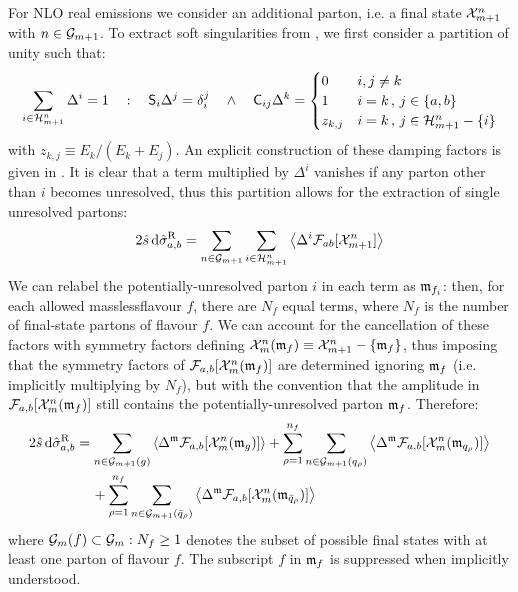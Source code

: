 For NLO real emissions we consider an additional parton, i.e. a final state $ \mathcal{X}^{n}_{m+1} $ with $ n \in \mathcal{G}_{m+1} $. To extract soft singularities from , we first consider a partition of unity such that:
\begin{equation}
  \sum_{i \in \mathcal{H}^{n}_{m+1}} \Delta^i = 1
  \quad : \quad
  \mathsf{S}_i \Delta^j = \delta_i^j
  \quad \land \quad
  \mathsf{C}_{ij} \Delta^k =
  \begin{cases}
    0 & i,j \neq k \\
    1 & i = k \,,\, j \in \{a,b\} \\
    z_{k,j} & i = k \,,\, j \in \mathcal{H}^{n}_{m+1} - \{i\}
  \end{cases}
  \label{eq:delta-part}
\end{equation}
with $ z_{k,j} \equiv E_k / (E_k + E_j) $. An explicit construction of these damping factors is given in . It is clear that a term multiplied by $ \Delta^i $ vanishes if any parton other than $ i $ becomes unresolved, thus this partition allows for the extraction of single unresolved partons:
\begin{equation*}
  2\hat{s}\, \mathrm{d}\hat{\sigma}_{a,b}^\text{R} = \sum_{n \in \mathcal{G}_{m+1}} \sum_{i \in \mathcal{H}^{n}_{m+1}} \left\langle \Delta^i \mathcal{F}_{ab}[\mathcal{X}^{n}_{m+1}] \right\rangle
\end{equation*}
We can relabel the potentially-unresolved parton $ i $ in each term as $ \mathfrak{m}_{f_i} $: then, for each allowed massless\footnotemark flavour $ f $, there are $ N_f $ equal terms, where $ N_f $ is the number of final-state partons of flavour $ f $. We can account for the cancellation of these factors with symmetry factors defining $ \mathcal{X}^{n}_{m}(\mathfrak{m}_f) \equiv \mathcal{X}^{n}_{m+1} - \{\mathfrak{m}_f\} $, thus imposing that the symmetry factors of $ \mathcal{F}_{a,b}[\mathcal{X}^{n}_{m}(\mathfrak{m}_f)] $ are determined ignoring $ \mathfrak{m}_f $ (i.e. implicitly multiplying by $ N_f $), but with the convention that the amplitude in $ \mathcal{F}_{a,b}[\mathcal{X}^{n}_{m}(\mathfrak{m}_f)] $ still contains the potentially-unresolved parton $ \mathfrak{m}_f $. Therefore:
\begin{equation}
  \begin{split}
    2\hat{s}\, \mathrm{d}\hat{\sigma}_{a,b}^\text{R}
    & = \sum_{n \in \mathcal{G}_{m+1}(g)} \left\langle \Delta^{\mathfrak{m}} \mathcal{F}_{a,b}[\mathcal{X}^{n}_{m}(\mathfrak{m}_g)] \right\rangle + \sum_{\rho = 1}^{n_f} \sum_{n \in \mathcal{G}_{m+1}(q_\rho)} \left\langle \Delta^{\mathfrak{m}} \mathcal{F}_{a,b}[\mathcal{X}^{n}_{m}(\mathfrak{m}_{q_\rho})] \right\rangle \\
    & \quad\, + \sum_{\rho = 1}^{n_f} \sum_{n \in \mathcal{G}_{m+1}(\bar{q}_\rho)} \left\langle \Delta^{\mathfrak{m}} \mathcal{F}_{a,b}[\mathcal{X}^{n}_{m}(\mathfrak{m}_{\bar{q}_\rho})] \right\rangle
  \end{split}
  \label{eq:part-chan}
\end{equation}
where $ \mathcal{G}_m(f) \subset \mathcal{G}_m : N_f \ge 1 $ denotes the subset of possible final states with at least one parton of flavour $ f $. The subscript $ f $ in $ \mathfrak{m}_f $ is suppressed when implicitly understood.

